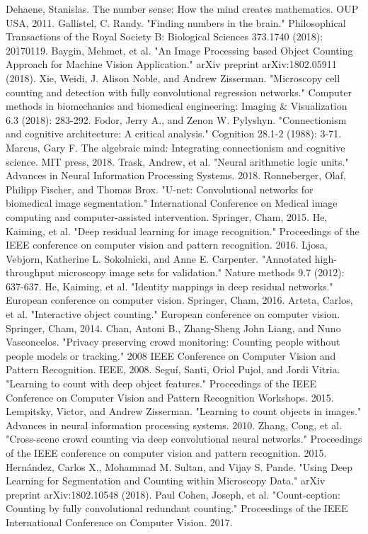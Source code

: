\documentclass[conference]{IEEEtran}
\begin{document}
\begin{thebibliography}{00}

  Dehaene, Stanislas. The number sense: How the mind creates mathematics. OUP USA, 2011.
 Gallistel, C. Randy. "Finding numbers in the brain." Philosophical Transactions of the Royal Society B: Biological Sciences 373.1740 (2018): 20170119.
 Baygin, Mehmet, et al. "An Image Processing based Object Counting Approach for Machine Vision Application." arXiv preprint arXiv:1802.05911 (2018).
 Xie, Weidi, J. Alison Noble, and Andrew Zisserman. "Microscopy cell counting and detection with fully convolutional regression networks." Computer methods in biomechanics and biomedical engineering: Imaging \& Visualization 6.3 (2018): 283-292.
Fodor, Jerry A., and Zenon W. Pylyshyn. "Connectionism and cognitive architecture: A critical analysis." Cognition 28.1-2 (1988): 3-71.
Marcus, Gary F. The algebraic mind: Integrating connectionism and cognitive science. MIT press, 2018.
 Trask, Andrew, et al. "Neural arithmetic logic units." Advances in Neural Information Processing Systems. 2018.
 Ronneberger, Olaf, Philipp Fischer, and Thomas Brox. "U-net: Convolutional networks for biomedical image segmentation." International Conference on Medical image computing and computer-assisted intervention. Springer, Cham, 2015.
 He, Kaiming, et al. "Deep residual learning for image recognition." Proceedings of the IEEE conference on computer vision and pattern recognition. 2016.
Ljosa, Vebjorn, Katherine L. Sokolnicki, and Anne E. Carpenter. "Annotated high-throughput microscopy image sets for validation." Nature methods 9.7 (2012): 637-637.
 He, Kaiming, et al. "Identity mappings in deep residual networks." European conference on computer vision. Springer, Cham, 2016.
 Arteta, Carlos, et al. "Interactive object counting." European conference on computer vision. Springer, Cham, 2014.
 Chan, Antoni B., Zhang-Sheng John Liang, and Nuno Vasconcelos. "Privacy preserving crowd monitoring: Counting people without people models or tracking." 2008 IEEE Conference on Computer Vision and Pattern Recognition. IEEE, 2008.
Seguí, Santi, Oriol Pujol, and Jordi Vitria. "Learning to count with deep object features." Proceedings of the IEEE Conference on Computer Vision and Pattern Recognition Workshops. 2015.
 Lempitsky, Victor, and Andrew Zisserman. "Learning to count objects in images." Advances in neural information processing systems. 2010.
 Zhang, Cong, et al. "Cross-scene crowd counting via deep convolutional neural networks." Proceedings of the IEEE conference on computer vision and pattern recognition. 2015.
 Hernández, Carlos X., Mohammad M. Sultan, and Vijay S. Pande. "Using Deep Learning for Segmentation and Counting within Microscopy Data." arXiv preprint arXiv:1802.10548 (2018).
 Paul Cohen, Joseph, et al. "Count-ception: Counting by fully convolutional redundant counting." Proceedings of the IEEE International Conference on Computer Vision. 2017.


\end{thebibliography}
\end{document}

